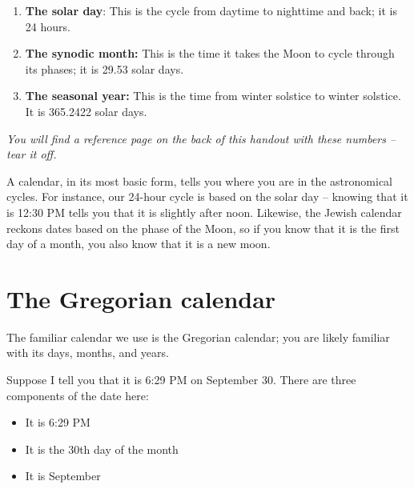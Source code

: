 \documentclass[11pt]{article}
\begin{document}
\begin{enumerate}
	\item {\bf The solar day}: This is the cycle from daytime to nighttime and back; it is 24 hours.
	\item {\bf The synodic month:} This is the time it takes the Moon to cycle through its phases; it is 29.53 solar days.
	\item {\bf The seasonal year:} This is the time from winter solstice to winter solstice. It is 365.2422 solar days.
\end{enumerate}

{\it You will find a reference page on the back of this handout with these numbers -- tear it off.}



A calendar, in its most basic form, tells you where you are in the astronomical cycles. For instance, our 24-hour cycle is based on the solar day -- knowing that it is 12:30 PM tells you that it is slightly after noon. Likewise, the Jewish calendar reckons dates based on the phase of the Moon, so if you know that it is the first day of a month, you also know that it is a new moon. 



\section{The Gregorian calendar}

The familiar calendar we use is the Gregorian calendar; you are likely familiar with its days, months, and years.

Suppose I tell you that it is 6:29 PM on September 30.  There are three components of the date here: 

\begin{itemize}
	\item It is 6:29 PM
	\item It is the 30th day of the month
	\item It is September
\end{itemize}
\end{document}
